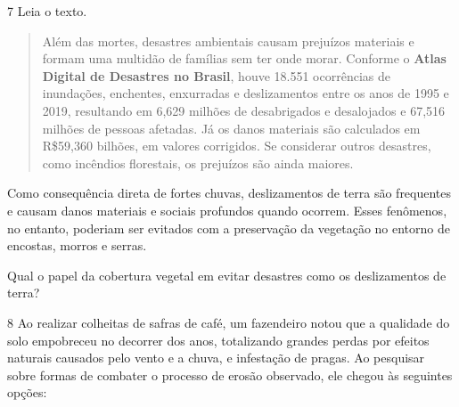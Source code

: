 \num{7} Leia o texto.

\begin{quote}\enlargethispage{2\baselineskip}
Além das mortes, desastres ambientais causam prejuízos materiais e
formam uma multidão de famílias sem ter onde morar. Conforme o
\textbf{Atlas Digital de Desastres no Brasil}, houve 18.551 ocorrências
de inundações, enchentes, enxurradas e deslizamentos entre os anos de
1995 e 2019, resultando em 6,629 milhões de desabrigados e desalojados e
67,516 milhões de pessoas afetadas. Já os danos materiais são calculados
em R\$59,360 bilhões, em valores corrigidos. Se considerar outros
desastres, como incêndios florestais, os prejuízos são ainda maiores.
\end{quote}

\pagebreak

Como consequência direta de fortes chuvas, deslizamentos de terra são
frequentes e causam danos materiais e sociais profundos quando ocorrem.
Esses fenômenos, no entanto, poderiam ser evitados com a preservação da
vegetação no entorno de encostas, morros e serras.

Qual o papel da cobertura vegetal em evitar desastres como os
deslizamentos de terra?


\num{8} Ao realizar colheitas de safras de café, um fazendeiro
notou que a qualidade do solo empobreceu no decorrer dos anos,
totalizando grandes perdas por efeitos naturais causados pelo vento e a
chuva, e infestação de pragas. Ao pesquisar sobre formas de combater o
processo de erosão observado, ele chegou às seguintes opções:

